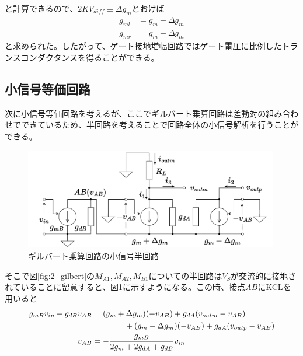             と計算できるので、$2KV_{diff}\equiv\Delta g_{m}$とおけば
            \begin{align}
                g_{ml}&=g_{m}+\Delta g_{m}   \label{eq:2_dgml}\\
                g_{mr}&=g_{m}-\Delta g_{m}   \label{eq:2_dgmr}
            \end{align}
            と求められた。したがって、ゲート接地増幅回路ではゲート電圧に比例したトランスコンダクタンスを得ることができる。
            \newpage
            
        \subsection{小信号等価回路}
            次に小信号等価回路を考えるが、ここでギルバート乗算回路は差動対の組み合わせでできているため、半回路を考えることで回路全体の小信号解析を行うことができる。
            \begin{figure}[!b]
                \begin{center}

                    \includegraphics[width=0.99\textwidth]{figures/chapter2/halfeq.pdf}
                    \caption{ギルバート乗算回路の小信号半回路}
                    \label{fig:2_half}

                \end{center}

            \end{figure}
            そこで図\ref{fig:2_gilbert}の$M_{A1},M_{A2},M_{B1}$についての半回路は$V_{S}$が交流的に接地されていることに留意すると、図\ref{fig:2_half}に示すようになる。この時、接点$AB$にKCLを用いると
            \begin{align}
                g_{mB}v_{in}+g_{dB}v_{AB}&=(g_{m}+\Delta g_{m})(-v_{AB})+g_{dA}(v_{outm}-v_{AB})    \notag\\
                &\quad\quad\quad\quad +(g_{m}-\Delta g_{m})(-v_{AB})+g_{dA}(v_{outp}-v_{AB})     \notag\\
                v_{AB}&=-\frac{g_{mB}}{2g_{m}+2g_{dA}+g_{dB}}v_{in}     \label{eq:2_vab}
            \end{align}
